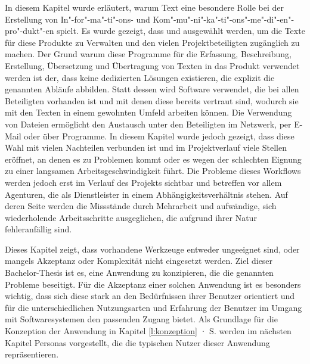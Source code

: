 In diesem Kapitel wurde erläutert, warum Text eine besondere Rolle bei der Erstellung von In"-for"-ma"-ti"-ons- und Kom"-mu"-ni"-ka"-ti"-ons"-me"-di"-en"-pro"-dukt"-en spielt. Es wurde gezeigt, dass  und  ausgewählt werden, um die Texte für diese Produkte zu Verwalten und den vielen Projektbeteiligten zugänglich zu machen. Der Grund warum diese Programme für die Erfassung, Beschreibung, Erstellung, Übersetzung und Übertragung von Texten in das Produkt verwendet werden ist der, dass keine dedizierten Lösungen existieren, die explizit die genannten Abläufe abbilden. Statt dessen wird Software verwendet, die bei allen Beteiligten vorhanden ist und mit denen diese bereits vertraut sind, wodurch sie mit den Texten in einem gewohnten Umfeld arbeiten können. Die Verwendung von Dateien ermöglicht den Austausch unter den Beteiligten im Netzwerk, per E-Mail oder über Programme. In diesem Kapitel wurde jedoch gezeigt, dass diese Wahl mit vielen Nachteilen verbunden ist und im Projektverlauf viele Stellen eröffnet, an denen es zu Problemen kommt oder es wegen der schlechten Eignung zu einer langsamen Arbeitsgeschwindigkeit führt. Die Probleme dieses Workflows werden jedoch erst im Verlauf des Projekts sichtbar und betreffen vor allem Agenturen, die als Dienstleister in einem Abhängigkeitsverhältnis stehen. Auf deren Seite werden die Missstände durch Mehrarbeit und aufwändige, sich wiederholende Arbeitsschritte ausgeglichen, die aufgrund ihrer Natur fehleranfällig sind.

\secbar

Dieses Kapitel zeigt, dass vorhandene Werkzeuge entweder ungeeignet sind, oder mangels Akzeptanz oder Komplexität nicht eingesetzt werden. Ziel dieser Bachelor-Thesis ist es, eine Anwendung zu konzipieren, die die genannten Probleme beseitigt. Für die Akzeptanz einer solchen Anwendung ist es besonders wichtig, dass sich diese stark an den Bedürfnissen ihrer Benutzer orientiert und für die unterschiedlichen Nutzungsarten und Erfahrung der Benutzer im Umgang mit Softwaresystemen den passenden Zugang bietet. Als Grundlage für die Konzeption der Anwendung in Kapitel \ref{l:konzeption} · S.\pageref{l:konzeption} werden im nächsten Kapitel Personas vorgestellt, die die typischen Nutzer dieser Anwendung repräsentieren.

\pagebreak